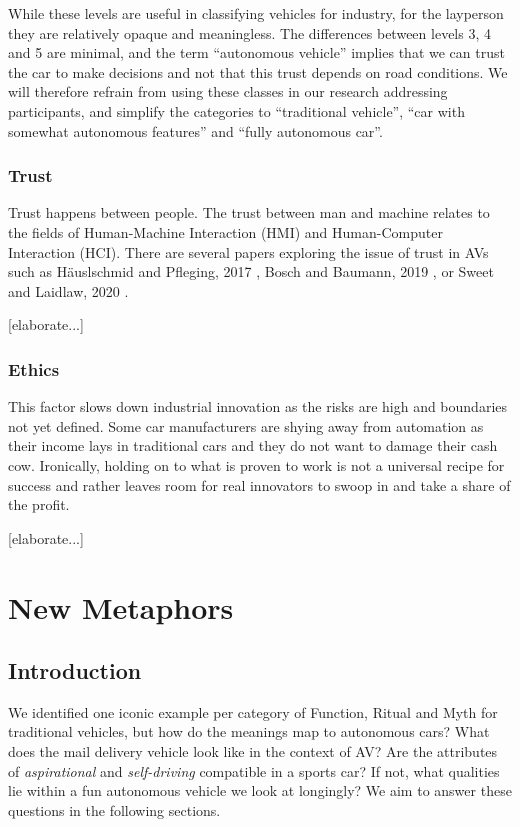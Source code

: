 \documentclass[12pt, usenames, dvipsnames]{report}
\begin{document}
\begin{flushleft}
While these levels are useful in classifying vehicles for industry, for the layperson they are relatively opaque and meaningless.
The differences between levels 3, 4 and 5 are minimal, and the term ``autonomous vehicle'' implies that we can trust the car to make decisions and not that this trust depends on road conditions.
We will therefore refrain from using these classes in our research addressing participants, and simplify the categories to ``traditional vehicle'', ``car with somewhat autonomous features'' and ``fully autonomous car''.

\subsection{Trust}
\label{sec:trust}

Trust happens between people. 
The trust between man and machine relates to the fields of Human-Machine Interaction (HMI) and Human-Computer Interaction (HCI).
There are several papers exploring the issue of trust in AVs such as Häuslschmid and Pfleging, 2017 \cite{haeuslschmid2017}, Bosch and Baumann, 2019 \cite{bosch2019}, or Sweet and Laidlaw, 2020 \cite{sweet2020}.

[elaborate...]

\subsection{Ethics}

This factor slows down industrial innovation as the risks are high and boundaries not yet defined.
Some car manufacturers are shying away from automation as their income lays in traditional cars and they do not want to damage their cash cow.
Ironically, holding on to what is proven to work is not a universal recipe for success and rather leaves room for real innovators to swoop in and take a share of the profit.

[elaborate...]


\chapter{New Metaphors}
\label{sec:newmetaphors}

\section*{Introduction}

We identified one iconic example per category of Function, Ritual and Myth for traditional vehicles, but how do the meanings map to autonomous cars?
What does the mail delivery vehicle look like in the context of AV? 
Are the attributes of \emph{aspirational} and \emph{self-driving} compatible in a sports car?
If not, what qualities lie within a fun autonomous vehicle we look at longingly?
We aim to answer these questions in the following sections.


\end{flushleft}
\end{document}
